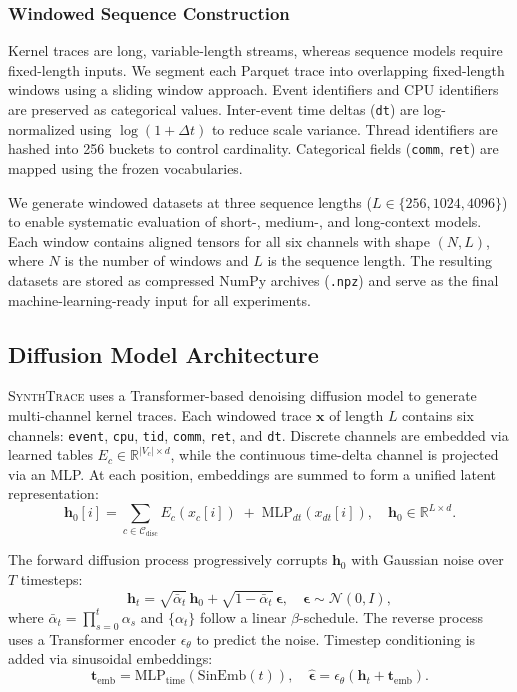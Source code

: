 \subsubsection{Windowed Sequence Construction}
\label{sec:windowing}

Kernel traces are long, variable-length streams, whereas sequence models require fixed-length inputs. We segment each Parquet trace into overlapping fixed-length windows using a sliding window approach. Event identifiers and CPU identifiers are preserved as categorical values. Inter-event time deltas (\texttt{dt}) are log-normalized using $\log(1 + \Delta t)$ to reduce scale variance. Thread identifiers are hashed into 256 buckets to control cardinality. Categorical fields (\texttt{comm}, \texttt{ret}) are mapped using the frozen vocabularies.

We generate windowed datasets at three sequence lengths ($L \in \{256, 1024, 4096\}$) to enable systematic evaluation of short-, medium-, and long-context models. Each window contains aligned tensors for all six channels with shape $(N, L)$, where $N$ is the number of windows and $L$ is the sequence length. The resulting datasets are stored as compressed NumPy archives (\texttt{.npz}) and serve as the final machine-learning-ready input for all experiments.








\subsection{Diffusion Model Architecture}
\label{sec:diffusion-model}

\textsc{SynthTrace} uses a Transformer-based denoising diffusion model to generate multi-channel kernel traces. Each windowed trace $\mathbf{x}$ of length $L$ contains six channels: \texttt{event}, \texttt{cpu}, \texttt{tid}, \texttt{comm}, \texttt{ret}, and \texttt{dt}. Discrete channels are embedded via learned tables $E_c \in \mathbb{R}^{|V_c| \times d}$, while the continuous time-delta channel is projected via an MLP. At each position, embeddings are summed to form a unified latent representation:
\[
\mathbf{h}_0[i] = \sum_{c \in \mathcal{C}_{\text{disc}}} E_c(x_c[i]) \;+\; \mathrm{MLP}_{dt}(x_{dt}[i]),
\quad \mathbf{h}_0 \in \mathbb{R}^{L \times d}.
\]


The forward diffusion process progressively corrupts $\mathbf{h}_0$ with Gaussian noise over $T$ timesteps:
\[
\mathbf{h}_t = \sqrt{\bar{\alpha}_t}\,\mathbf{h}_0 + \sqrt{1-\bar{\alpha}_t}\,\boldsymbol{\epsilon},
\quad \boldsymbol{\epsilon} \sim \mathcal{N}(0, I),
\]
where $\bar{\alpha}_t = \prod_{s=0}^{t}\alpha_s$ and $\{\alpha_t\}$ follow a linear $\beta$-schedule. The reverse process uses a Transformer encoder $\epsilon_{\theta}$ to predict the noise. Timestep conditioning is added via sinusoidal embeddings:
\[
\mathbf{t}_{\text{emb}} = \mathrm{MLP}_{\text{time}}(\mathrm{SinEmb}(t)), \quad
\hat{\boldsymbol{\epsilon}} = \epsilon_{\theta}(\mathbf{h}_t + \mathbf{t}_{\text{emb}}).
\]

